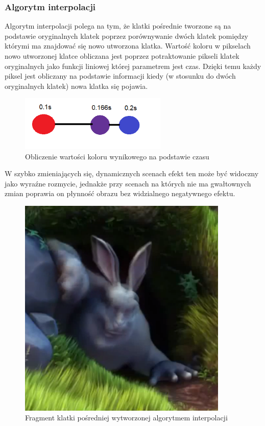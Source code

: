 \documentclass[twoside]{projektInzynierskiMS}
\begin{document}
\subsubsection{Algorytm interpolacji}
Algorytm interpolacji polega na tym, że klatki pośrednie tworzone są na podstawie oryginalnych klatek poprzez porównywanie dwóch klatek pomiędzy którymi ma znajdować się nowo utworzona klatka. Wartość koloru w pikselach nowo utworzonej klatce obliczana jest poprzez potraktowanie pikseli klatek oryginalnych jako funkcji liniowej której parametrem jest czas. Dzięki temu każdy piksel jest obliczany na podstawie informacji kiedy (w stosunku do dwóch oryginalnych klatek) nowa klatka się pojawia.

\begin{figure}[h]
\centering
\includegraphics[width=7cm]{FpsInterpolation.png}
\caption{Obliczenie wartości koloru wynikowego na podstawie czasu}
\end{figure}

W szybko zmieniających się, dynamicznych scenach efekt ten może być widoczny jako wyraźne rozmycie, jednakże przy scenach na których nie ma gwałtownych zmian poprawia on płynność obrazu bez widzialnego negatywnego efektu.

\begin{figure}[h]
\centering
\includegraphics[width=10cm]{FpsInterpolationBunny.png}
\caption{Fragment klatki pośredniej wytworzonej algorytmem interpolacji}
\label{fig:fpsIntBunny}
\end{figure}
\end{document}
